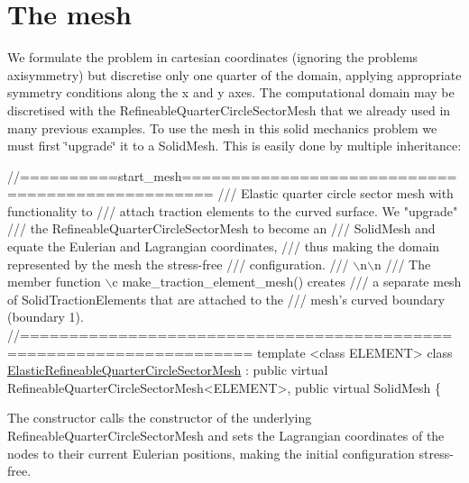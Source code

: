  

\hypertarget{index_mesh}{}\section{The mesh}\label{index_mesh}
We formulate the problem in cartesian coordinates (ignoring the problem\textquotesingle{}s axisymmetry) but discretise only one quarter of the domain, applying appropriate symmetry conditions along the x and y axes. The computational domain may be discretised with the {\ttfamily Refineable\+Quarter\+Circle\+Sector\+Mesh} that we already used in many previous examples. To use the mesh in this solid mechanics problem we must first \char`\"{}upgrade\char`\"{} it to a {\ttfamily Solid\+Mesh}. This is easily done by multiple inheritance\+:

 
\begin{DoxyCodeInclude}
\textcolor{comment}{//==========start\_mesh=================================================}
\textcolor{comment}{/// Elastic quarter circle sector mesh with functionality to}
\textcolor{comment}{}\textcolor{comment}{/// attach traction elements to the curved surface. We "upgrade"}
\textcolor{comment}{}\textcolor{comment}{/// the RefineableQuarterCircleSectorMesh to become an}
\textcolor{comment}{}\textcolor{comment}{/// SolidMesh and equate the Eulerian and Lagrangian coordinates,}
\textcolor{comment}{}\textcolor{comment}{/// thus making the domain represented by the mesh the stress-free }
\textcolor{comment}{}\textcolor{comment}{/// configuration. }
\textcolor{comment}{}\textcolor{comment}{/// \(\backslash\)n\(\backslash\)n}
\textcolor{comment}{}\textcolor{comment}{/// The member function \(\backslash\)c make\_traction\_element\_mesh() creates}
\textcolor{comment}{}\textcolor{comment}{/// a separate mesh of SolidTractionElements that are attached to the}
\textcolor{comment}{}\textcolor{comment}{/// mesh's curved boundary (boundary 1). }
\textcolor{comment}{}\textcolor{comment}{//=====================================================================}
\textcolor{keyword}{template} <\textcolor{keyword}{class} ELEMENT>
\textcolor{keyword}{class }\hyperlink{classElasticRefineableQuarterCircleSectorMesh}{ElasticRefineableQuarterCircleSectorMesh} :
 \textcolor{keyword}{public} \textcolor{keyword}{virtual} RefineableQuarterCircleSectorMesh<ELEMENT>,
 \textcolor{keyword}{public} \textcolor{keyword}{virtual} SolidMesh
\{

\end{DoxyCodeInclude}


The constructor calls the constructor of the underlying {\ttfamily Refineable\+Quarter\+Circle\+Sector\+Mesh} and sets the Lagrangian coordinates of the nodes to their current Eulerian positions, making the initial configuration stress-\/free.


